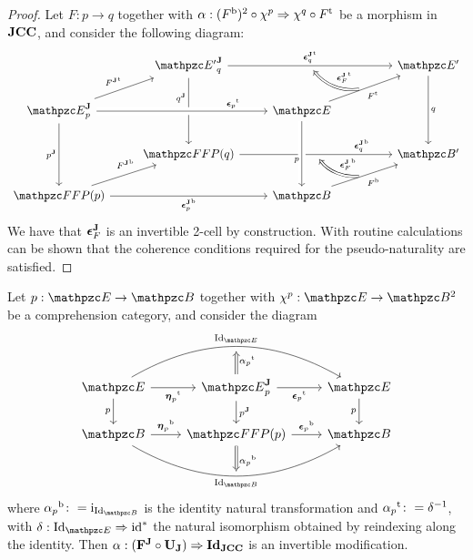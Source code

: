 \documentclass{lmcs} %
\theoremstyle{plain}\newtheorem{satz}[thm]{Satz} %
\begin{document}
\begin{proof}
	Let $F:p\rightarrow q$ together with $\alpha:({F}^{\mathrm{b}})^{2}\circ \chi^{p} \Rightarrow \chi^{q}\circ {F}^{\mathrm{t}}$ be a morphism in $\mathbf{JCC}$, and consider the following diagram:
	\[\begin{tikzcd}
		& {\JDom{\ct{E}'}{q}} &&& {\ct{E}'} \\
		{\JDomE{p}} && {\ct{E}} \\
		& {\FFFP{q}} &&& {\ct{B'}} \\
		{\FFFP{p}} && {\ct{B}}
		\arrow[""{name=0, anchor=center, inner sep=0}, "{{{\ft{\Jcoun{q}}}}}", from=1-2, to=1-5]
		\arrow["{{{\JFib{q}}}}"'{pos=0.3}, from=1-2, to=3-2]
		\arrow["{{{q}}}", from=1-5, to=3-5]
		\arrow["{{{\ft{\JFun{F}}}}}", from=2-1, to=1-2]
		\arrow["{{{\ft{\twont{\epsilon}_p}}}}"{pos=0.8}, from=2-1, to=2-3, crossing over]
		\arrow["{{{\JFib{p}}}}"', from=2-1, to=4-1]
		\arrow[""{name=1, anchor=center, inner sep=0}, "{{\ft{F}}}"', from=2-3, to=1-5]
		\arrow[""{name=2, anchor=center, inner sep=0}, "{{{\fb{\Jcoun{q}}}}}"{pos=0.8}, from=3-2, to=3-5]
		\arrow["p"'{pos=0.6}, from=2-3, to=4-3, crossing over]
		\arrow["{{{\fb{\JFun{F}}}}}"{pos=0.7}, from=4-1, to=3-2]
		\arrow["{{\fb{\Jcoun{p}}}}"', from=4-1, to=4-3]
		\arrow[""{name=3, anchor=center, inner sep=0}, "{{\fb{F}}}"', from=4-3, to=3-5]
		\arrow["{\ft{\Jcoun{F}}}"', bend left, shorten <=4pt, shorten >=4pt, Rightarrow, from=1, to=0]
		\arrow["{\fb{\Jcoun{F}}}"', bend left, shorten <=4pt, shorten >=4pt, Rightarrow, from=3, to=2]
	\end{tikzcd}\]
	We have that $\boldsymbol{\epsilon}^{\mathbf{J}}_{F}$ is an invertible 2-cell by construction. With routine calculations can be shown that the coherence conditions required for the pseudo-naturality are satisfied.
\end{proof}

\begin{prop}\label{prop:trian-id-1}
	Let $p:\ct{E}\to \ct{B}$ together with $\jcomp{p}:\ct{E}\rightarrow \Arr{\ct{B}}$ be a comprehension category, and consider the diagram
	\[\begin{tikzcd}
		{\ct{E}} & {\JDomE{p}} & {\ct{E}} \\
		{\ct{B}} & {\FFFP{p}} & {\ct{B}}
		\arrow["{{\ft{\twont{\eta}_p}}}"', from=1-1, to=1-2]
		\arrow[""{name=0, anchor=center, inner sep=0}, "{{{\Id{\ct{E}}}}}", bend left, from=1-1, to=1-3]
		\arrow["p"', from=1-1, to=2-1]
		\arrow["{{\ft{\twont{\epsilon}_p}}}"', from=1-2, to=1-3]
		\arrow["{{{\JFib{p}}}}", from=1-2, to=2-2]
		\arrow["p"', from=1-3, to=2-3]
		\arrow["{\fb{\twont{\eta}_p}}", from=2-1, to=2-2]
		\arrow[""{name=1, anchor=center, inner sep=0}, "{{{\Id{\ct{B}}}}}"', bend right, from=2-1, to=2-3]
		\arrow["{\fb{\twont{\epsilon}_p}}", from=2-2, to=2-3]
		\arrow["{\ft{\alpha_p}}"', shorten >=3pt, Rightarrow, from=1-2, to=0]
		\arrow["{\fb{\alpha_p}}", shorten >=3pt, Rightarrow, from=2-2, to=1]
	\end{tikzcd}\]
	where $\fb{\alpha_p}\colon = \idtwo{\Id{\ct{B}}}$ is the identity natural transformation and ${\alpha_p}^{\mathrm{t}}\colon = \delta^{-1}$, with $\delta:\Id{\ct{E}}\nt \reind{\id{}}$ the natural isomorphism obtained by reindexing along the identity. Then $\alpha:(\mathbf{F^J}\circ \mathbf{U_J})\Rightarrow \boldsymbol{\mathrm{Id}_{\mathbf{JCC}}}$ is an invertible modification.
\end{prop}
\end{document}
